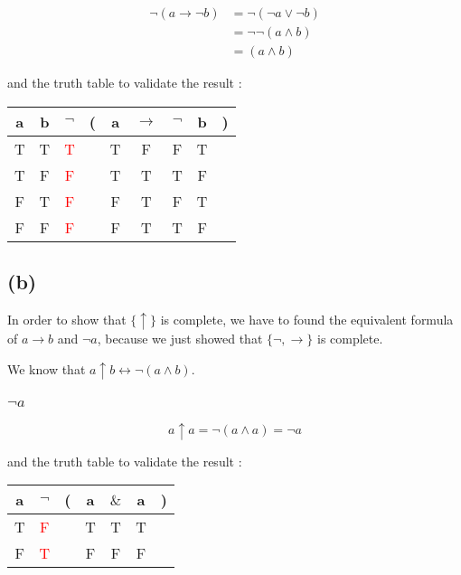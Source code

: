 \documentclass[a4paper,11pt]{report}
\begin{document}
\begin{align*}
  \neg (a \rightarrow \neg b) &= \neg (\neg a \vee \neg b) \\
                              & = \neg \neg (a \wedge b) \\
                              &= (a \wedge b)
\end{align*}

and the truth table to validate the result :

\begin{center}
  \begin{tabular}{@{ }c@{ }@{ }c | c@{ }@{}c@{}@{ }c@{ }@{ }c@{ }@{ }c@{ }@{ }c@{ }@{}c@{ }}
    a & b & $\neg$ & ( & a & $\rightarrow$ & $\neg$ & b & )\\
    \hline 
    T & T & \textcolor{red}{T} &  & T & F & F & T & \\
    T & F & \textcolor{red}{F} &  & T & T & T & F & \\
    F & T & \textcolor{red}{F} &  & F & T & F & T & \\
    F & F & \textcolor{red}{F} &  & F & T & T & F & \\
  \end{tabular}
\end{center}

\subsection*{(b)}

In order to show that $\{\uparrow\}$ is complete, we have to found the
equivalent formula of $a \rightarrow b$ and $\neg a$, because we just showed
that $\{\neg,\rightarrow\}$ is complete.

We know that $a \uparrow b \leftrightarrow \neg (a \wedge b)$.

\subsubsection*{$\neg a$}

\[
  a \uparrow a = \neg (a \wedge a) = \neg a
\]

and the truth table to validate the result :
\begin{center}
  \begin{tabular}{@{ }c | c@{ }@{}c@{}@{ }c@{ }@{ }c@{ }@{ }c@{ }@{}c@{ }}
    a & $\neg$ & ( & a & $\&$ & a & )\\
    \hline 
    T & \textcolor{red}{F} &  & T & T & T & \\
    F & \textcolor{red}{T} &  & F & F & F & \\
  \end{tabular}
\end{center}
\end{document}

